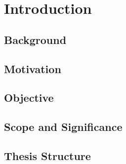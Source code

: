 \chapter{Introduction}
\section{Background}

\section{Motivation}

\section{Objective}

\section{Scope and Significance}

\section{Thesis Structure}
